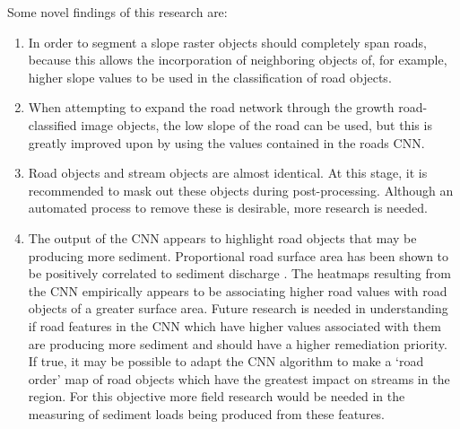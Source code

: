 \documentclass[remotesensing,article,submit,pdftex,moreauthors]{Definitions/mdpi}
\begin{document}
Some novel findings of this research are:
\begin{enumerate}[{\bf}]
\item In order to segment a slope raster objects should completely span roads, because this allows the incorporation of neighboring objects of, for example, higher slope values to be used in the classification of road objects.

\item When attempting to expand the road network through the growth road-classified image objects, the low slope of the road can be used, but this is greatly improved upon by using the values contained in the roads CNN.  

\item Road objects and stream objects are almost identical. At this stage, it is recommended to mask out these objects during post-processing. Although an automated process to remove these is desirable, more research is needed.

\item The output of the CNN appears to highlight road objects that may be producing more sediment. Proportional road surface area has been shown to be positively correlated to sediment discharge \cite{reid}. The heatmaps resulting from the CNN empirically appears to be associating higher road values with road objects of a greater surface area. Future research is needed in understanding if road features in the CNN which have higher values associated with them are producing more sediment and should have a higher remediation priority. If true, it may be possible to adapt the CNN algorithm to make a ‘road order’ map of road objects which have the greatest impact on streams in the region. For this objective more field research would be needed in the measuring of sediment loads being produced from these features.  
\end{enumerate}

\vspace{6pt} 


\end{document}
